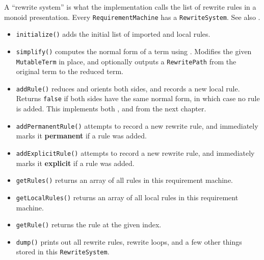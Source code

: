 \documentclass[../generics]{subfiles}
\begin{document}
A ``rewrite system'' is what the implementation calls the list of rewrite rules in a monoid presentation. Every \texttt{RequirementMachine} has a \texttt{RewriteSystem}. See also .
\begin{itemize}
\item \texttt{initialize()} adds the initial list of imported and local rules.
\item \texttt{simplify()} computes the normal form of a term using . Modifies the given \texttt{MutableTerm} in place, and optionally outputs a \texttt{RewritePath} from the original term to the reduced term.
\item \texttt{addRule()} reduces and orients both sides, and records a new local rule. Returns \texttt{false} if both sides have the same normal form, in which case no rule is added. This implements both , and  from the next chapter.
\item \texttt{addPermanentRule()} attempts to record a new rewrite rule, and immediately marks it \textbf{permanent} if a rule was added.
\item \texttt{addExplicitRule()} attempts to record a new rewrite rule, and immediately marks it \textbf{explicit} if a rule was added.
\item \texttt{getRules()} returns an array of all rules in this requirement machine.
\item \texttt{getLocalRules()} returns an array of all local rules in this requirement machine.
\item \texttt{getRule()} returns the rule at the given index.
\item \texttt{dump()} prints out all rewrite rules, rewrite loops, and a few other things stored in this \texttt{RewriteSystem}.
\end{itemize}
\end{document}
